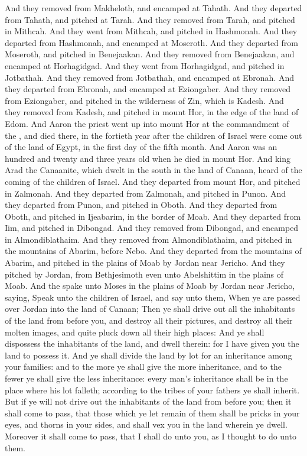 \begin{biblechapter}
\verse And they removed from Makheloth, and encamped at Tahath.
\verse And they departed from Tahath, and pitched at Tarah.
\verse And they removed from Tarah, and pitched in Mithcah.
\verse And they went from Mithcah, and pitched in Hashmonah.
\verse And they departed from Hashmonah, and encamped at Moseroth.
\verse And they departed from Moseroth, and pitched in Benejaakan.
\verse And they removed from Benejaakan, and encamped at Horhagidgad.
\verse And they went from Horhagidgad, and pitched in Jotbathah.
\verse And they removed from Jotbathah, and encamped at Ebronah.
\verse And they departed from Ebronah, and encamped at Eziongaber.
\verse And they removed from Eziongaber, and pitched in the wilderness of Zin, which is Kadesh.
\verse And they removed from Kadesh, and pitched in mount Hor, in the edge of the land of Edom.
\verse And Aaron the priest went up into mount Hor at the commandment of the \LORD, and died there, in the fortieth year after the children of Israel were come out of the land of Egypt, in the first day of the fifth month.
\verse And Aaron was an hundred and twenty and three years old when he died in mount Hor.
\verse And king Arad the Canaanite, which dwelt in the south in the land of Canaan, heard of the coming of the children of Israel.
\verse And they departed from mount Hor, and pitched in Zalmonah.
\verse And they departed from Zalmonah, and pitched in Punon.
\verse And they departed from Punon, and pitched in Oboth.
\verse And they departed from Oboth, and pitched in Ijeabarim, in the border of Moab.
\verse And they departed from Iim, and pitched in Dibongad.
\verse And they removed from Dibongad, and encamped in Almondiblathaim.
\verse And they removed from Almondiblathaim, and pitched in the mountains of Abarim, before Nebo.
\verse And they departed from the mountains of Abarim, and pitched in the plains of Moab by Jordan near Jericho.
\verse And they pitched by Jordan, from Bethjesimoth even unto Abelshittim in the plains of Moab.
\verse And the \LORD spake unto Moses in the plains of Moab by Jordan near Jericho, saying,
\verse Speak unto the children of Israel, and say unto them, When ye are passed over Jordan into the land of Canaan;
\verse Then ye shall drive out all the inhabitants of the land from before you, and destroy all their pictures, and destroy all their molten images, and quite pluck down all their high places:
\verse And ye shall dispossess the inhabitants of the land, and dwell therein: for I have given you the land to possess it.
\verse And ye shall divide the land by lot for an inheritance among your families: and to the more ye shall give the more inheritance, and to the fewer ye shall give the less inheritance: every man's inheritance shall be in the place where his lot falleth; according to the tribes of your fathers ye shall inherit.
\verse But if ye will not drive out the inhabitants of the land from before you; then it shall come to pass, that those which ye let remain of them shall be pricks in your eyes, and thorns in your sides, and shall vex you in the land wherein ye dwell.
\verse Moreover it shall come to pass, that I shall do unto you, as I thought to do unto them.
\end{biblechapter}

